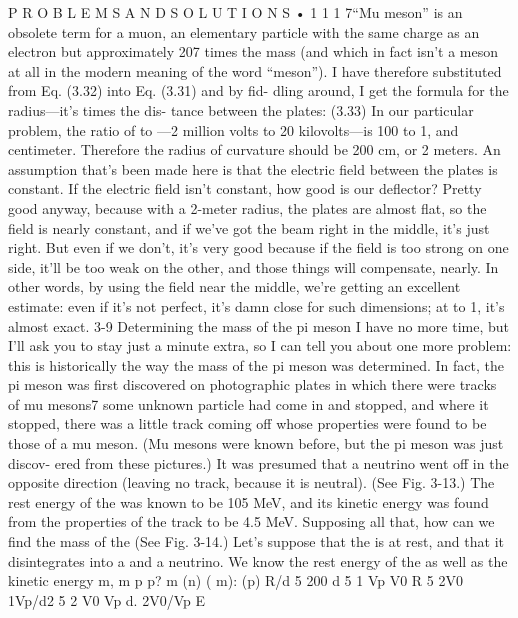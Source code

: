 \documentclass[10pt,oneside]{article}
\begin{document}
P R O B L E M S  A N D  S O L U T I O N S • 1 1 1 7“Mu meson” is an obsolete term for a muon, an elementary particle with the same charge as an electron but approximately 207 times the mass (and which in fact isn’t a meson at all in the modern meaning of the word “meson”). I have therefore substituted from Eq. (3.32) into Eq. (3.31) and by fid- dling around, I get the formula for the radius---it’s times the dis- tance between the plates: (3.33) In our particular problem, the ratio of to ---2 million volts to 20 kilovolts---is 100 to 1, and centimeter. Therefore the radius of curvature should be 200 cm, or 2 meters. An assumption that’s been made here is that the electric field between the plates is constant. If the electric field isn’t constant, how good is our deflector? Pretty good anyway, because with a 2-meter radius, the plates are almost flat, so the field is nearly constant, and if we’ve got the beam right in the middle, it’s just right. But even if we don’t, it’s very good because if the field is too strong on one side, it’ll be too weak on the other, and those things will compensate, nearly. In other words, by using the field near the middle, we’re getting an excellent estimate: even if it’s not perfect, it’s damn close for such dimensions; at to 1, it’s almost exact. 3-9 Determining the mass of the pi meson I have no more time, but I’ll ask you to stay just a minute extra, so I can tell you about one more problem: this is historically the way the mass of the pi meson was determined. In fact, the pi meson was first discovered on photographic plates in which there were tracks of mu mesons7 some unknown particle had come in and stopped, and where it stopped, there was a little track coming off whose properties were found to be those of a mu meson. (Mu mesons were known before, but the pi meson was just discov- ered from these pictures.) It was presumed that a neutrino went off in the opposite direction (leaving no track, because it is neutral). (See Fig. 3-13.) The rest energy of the was known to be 105 MeV, and its kinetic energy was found from the properties of the track to be 4.5 MeV. Supposing all that, how can we find the mass of the (See Fig. 3-14.) Let’s suppose that the is at rest, and that it disintegrates into a and a neutrino. We know the rest energy of the as well as the kinetic energy m, m p p? m (n) ( m): (p) R/d 5 200 d 5 1 Vp V0 R 5 2V0 1Vp/d2 5 2 V0 Vp d. 2V0/Vp E\par
\end{document}
